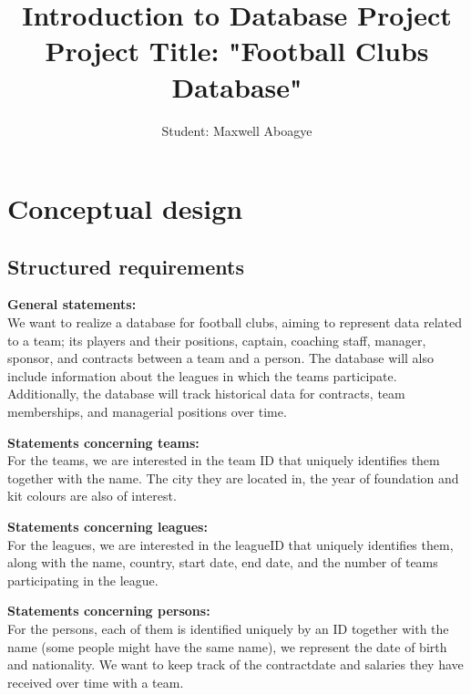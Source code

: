 \documentclass{article}[h]
\title{\huge Introduction to Database Project\\
    \vspace{6px}
    \huge \textbf {Project Title: "Football Clubs Database"}}
\author{Student: Maxwell Aboagye}
\begin{document}
\maketitle

\tableofcontents

\pagebreak

\section{Conceptual design}\label{sec:conceptual-design}

\subsection{Structured requirements}\label{subsec:structured-requirements}

\setlength{\parindent}{0cm}
\vspace{12px}
\textbf{General statements:\\}
We want to realize a database for football clubs, aiming to represent data related to a team; its players and their positions, captain, coaching staff, manager, sponsor, and contracts between a team and a person. The database will also include information about the leagues in which the teams participate. Additionally, the database will track historical data for contracts, team memberships, and managerial positions over time.

\vspace{12px}
\textbf{Statements concerning teams:\\}
For the teams, we are interested in the team ID that uniquely identifies them together with the name.
The city they are located in, the year of foundation and kit colours are also of interest.

\vspace{12px}
\textbf{Statements concerning leagues:\\}
For the leagues, we are interested in the leagueID that uniquely identifies them, along with the name, country, start date, end date, and the number of teams participating in the league.

\vspace{12px}
\textbf{Statements concerning persons:\\}
For the persons, each of them is identified uniquely by an ID together with the name (some people might have the same name), we represent the date of birth and nationality.
We want to keep track of the contract\rqs date and salaries they have received over time with a team.
\end{document}
